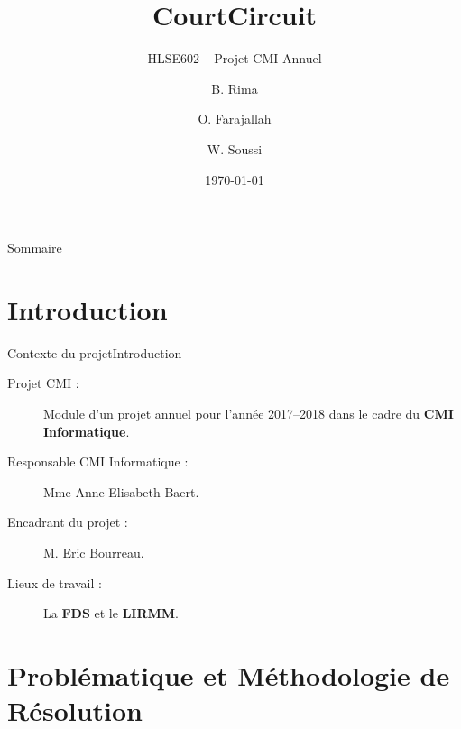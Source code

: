 \documentclass[usenames,dvipsnames]{beamer}
\title{CourtCircuit}
\subtitle{HLSE602 -- Projet CMI Annuel}
\author{B. Rima \and O. Farajallah \and W. Soussi}
\institute[UM]{L3 CMI Informatique}
\date{\today}
\begin{document}
\begin{frame}
\titlepage
\end{frame}
\begin{frame}[allowframebreaks]{Sommaire}
    \tableofcontents
\end{frame}
\section{Introduction}
\begin{frame}{Contexte du projet}{Introduction}
  \begin{description}
    \item [Projet CMI :] Module d'un projet annuel pour l'année 2017--2018 dans le cadre du \textbf{CMI Informatique}.
    \item [Responsable CMI Informatique :] Mme Anne-Elisabeth Baert.
    \item [Encadrant du projet :] M. Eric Bourreau.
    \item [Lieux de travail :] La \textbf{FDS} et le \textbf{LIRMM}.
  \end{description}
\end{frame}

\section{Problématique et Méthodologie de Résolution}
\end{document}
